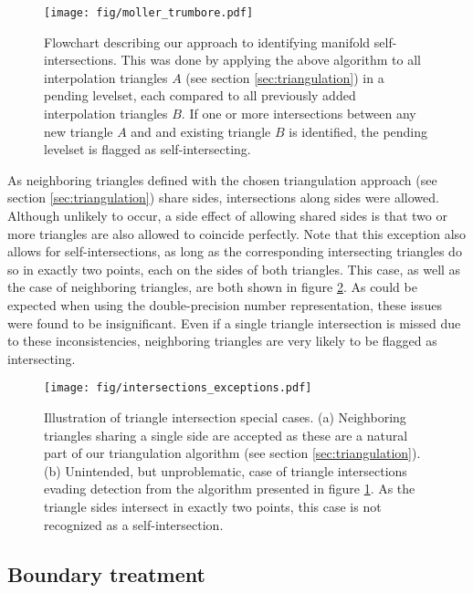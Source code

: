 \begin{figure}[h!] 
\centering
\texttt{[image: fig/moller\_trumbore.pdf]}
\caption{Flowchart describing our approach to identifying manifold self-intersections. This was done by applying the above algorithm to all interpolation triangles $A$ (see section \ref{sec:triangulation}) in a pending levelset, each compared to all previously added interpolation triangles $B$. If one or more intersections between any new triangle $A$ and and existing triangle $B$ is identified, the pending levelset is flagged as self-intersecting.}\label{fig:self-intersections}
\end{figure}

As neighboring triangles defined with the chosen triangulation approach (see section \ref{sec:triangulation}) share sides, intersections along sides were allowed. Although unlikely to occur, a side effect of allowing shared sides is that two or more triangles are also allowed to coincide perfectly. Note that this exception also allows for self-intersections, as long as the corresponding intersecting triangles do so in exactly two points, each on the sides of both triangles. This case, as well as the case of neighboring triangles, are both shown in figure \ref{fig:special_cases}. As could be expected when using the double-precision number representation, these issues were found to be insignificant. Even if a single triangle intersection is missed due to these inconsistencies, neighboring triangles are very likely to be flagged as intersecting. 
 
\begin{figure}[h!] 
\centering
\texttt{[image: fig/intersections\_exceptions.pdf]}
\caption{Illustration of triangle intersection special cases. (a) Neighboring triangles sharing a single side are accepted as these are a natural part of our triangulation algorithm (see section \ref{sec:triangulation}). (b) Unintended, but unproblematic, case of triangle intersections evading detection from the algorithm presented in figure \ref{fig:self-intersections}. As the triangle sides intersect in exactly two points, this case is not recognized as a self-intersection.}\label{fig:special_cases}
\end{figure}

\subsection{Boundary treatment}\label{sec:boundary_treatment}

